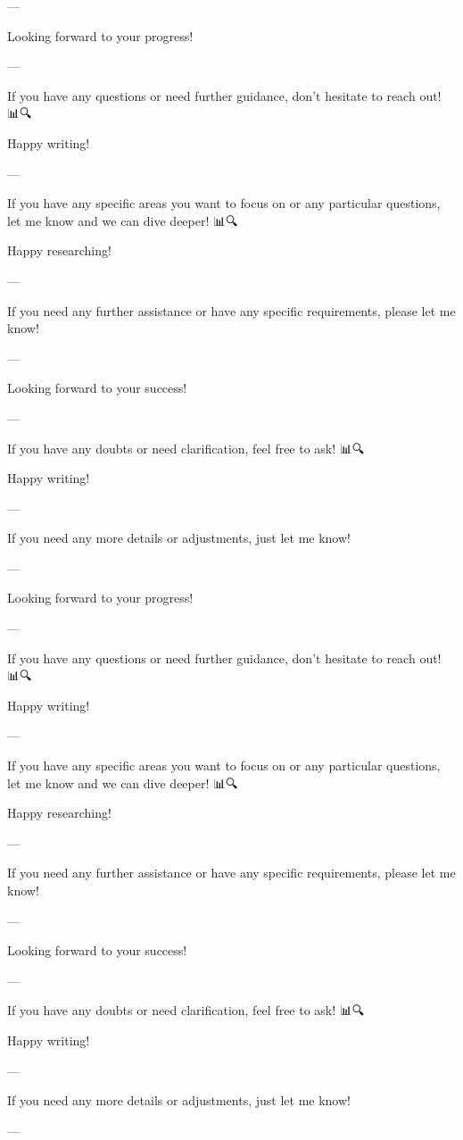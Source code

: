 --- 

Looking forward to your progress! 🚀🌟

--- 

If you have any questions or need further guidance, don't hesitate to reach out! 📊🔍

Happy writing! 📝✨

--- 

If you have any specific areas you want to focus on or any particular questions, let me know and we can dive deeper! 📊🔍

Happy researching! 📝🚀

--- 

If you need any further assistance or have any specific requirements, please let me know! 🙌

--- 

Looking forward to your success! 🚀🌟

--- 

If you have any doubts or need clarification, feel free to ask! 📊🔍

Happy writing! 📝✨

--- 

If you need any more details or adjustments, just let me know! 🙌

--- 

Looking forward to your progress! 🚀🌟

--- 

If you have any questions or need further guidance, don't hesitate to reach out! 📊🔍

Happy writing! 📝✨

--- 

If you have any specific areas you want to focus on or any particular questions, let me know and we can dive deeper! 📊🔍

Happy researching! 📝🚀

--- 

If you need any further assistance or have any specific requirements, please let me know! 🙌

--- 

Looking forward to your success! 🚀🌟

--- 

If you have any doubts or need clarification, feel free to ask! 📊🔍

Happy writing! 📝✨

--- 

If you need any more details or adjustments, just let me know! 🙌

--- 

